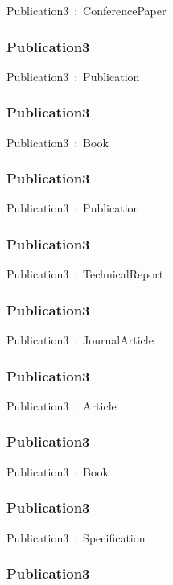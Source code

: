 \documentclass{article}
\begin{document}
Publication3~:~ConferencePaper

\subsubsection*{Publication3}

Publication3~:~Publication

\subsubsection*{Publication3}

Publication3~:~Book

\subsubsection*{Publication3}

Publication3~:~Publication

\subsubsection*{Publication3}

Publication3~:~TechnicalReport

\subsubsection*{Publication3}

Publication3~:~JournalArticle

\subsubsection*{Publication3}

Publication3~:~Article

\subsubsection*{Publication3}

Publication3~:~Book

\subsubsection*{Publication3}

Publication3~:~Specification

\subsubsection*{Publication3}
\end{document}
